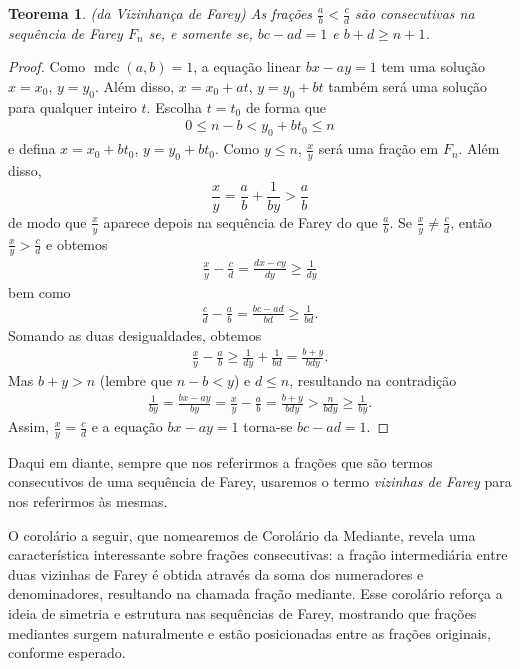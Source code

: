 \documentclass{hipatia}
\newtheorem*{theorem*}{Teorema}
\theoremstyle{definition} %
\begin{document}
\begin{theorem*} (da Vizinhança de Farey)
As frações \(\frac{a}{b} < \frac{c}{d}\) são consecutivas na sequência de Farey \(F_n\) se, e somente se, \(bc - ad = 1\) e $b+d\geq n+1$.
\end{theorem*}

\begin{proof}
Como \(\operatorname{mdc}(a, b) = 1\), a equação linear \(bx - ay = 1\) tem uma solução \(x = x_0\), \(y = y_0\). Além disso, \(x = x_0 + at\), \(y = y_0 + bt\) também será uma solução para qualquer inteiro \(t\). Escolha \(t = t_0\) de forma que
\begin{align*}
0 \leq n - b < y_0 + bt_0 \leq n
\end{align*}
e defina \(x = x_0 + bt_0\), \(y = y_0 + bt_0\). Como \(y \leq n\), \(\frac{x}{y}\) será uma fração em \(F_n\). Além disso,
\[
\frac{x}{y} = \frac{a}{b} + \frac{1}{by} > \frac{a}{b}
\]
de modo que \(\frac{x}{y}\) aparece depois na sequência de Farey do que \(\frac{a}{b}\). Se \(\frac{x}{y} \neq \frac{c}{d}\), então \(\frac{x}{y} > \frac{c}{d}\) e obtemos
\begin{align*}
\frac{x}{y} - \frac{c}{d} = \frac{dx - cy}{dy} \geq \frac{1}{dy}
\end{align*}
bem como
\begin{align*}
\frac{c}{d} - \frac{a}{b} = \frac{bc - ad}{bd} \geq \frac{1}{bd}.
\end{align*}
Somando as duas desigualdades, obtemos
\begin{align*}
\frac{x}{y} - \frac{a}{b} \geq \frac{1}{dy} + \frac{1}{bd} = \frac{b + y}{bdy}.
\end{align*}
Mas \(b + y > n\) (lembre que \(n - b < y\)) e \(d \leq n\), resultando na contradição
\begin{align*}
\frac{1}{by} = \frac{bx - ay}{by} = \frac{x}{y} - \frac{a}{b} = \frac{b + y}{bdy} > \frac{n}{bdy} \geq \frac{1}{by}.
\end{align*}
Assim, \(\frac{x}{y} = \frac{c}{d}\) e a equação \(bx - ay = 1\) torna-se \(bc - ad = 1\).
\end{proof}

Daqui em diante, sempre que nos referirmos a frações que são termos consecutivos de uma sequência de Farey, usaremos o termo \textit{vizinhas de Farey} para nos referirmos às mesmas. 

O corolário a seguir, que nomearemos de Corolário da Mediante, revela uma característica interessante sobre frações consecutivas: a fração intermediária entre duas vizinhas de Farey é obtida através da soma dos numeradores e denominadores, resultando na chamada fração mediante. Esse corolário reforça a ideia de simetria e estrutura nas sequências de Farey, mostrando que frações mediantes surgem naturalmente e estão posicionadas entre as frações originais, conforme esperado.
\end{document}
